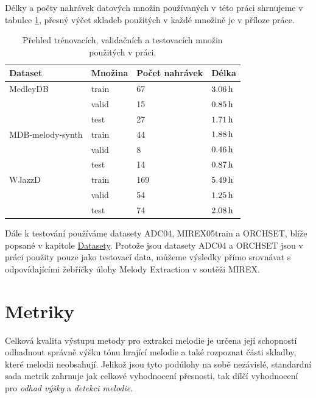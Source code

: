 Délky a počty nahrávek datových množin používaných v této práci shrnujeme v tabulce \ref{tab:data_splits}, přesný výčet skladeb použitých v každé množině je v příloze práce.

\begin{table}[h!]
\centering
\begin{tabular}{llll}
\toprule
Dataset          & Množina & Počet nahrávek & Délka \\
\midrule
MedleyDB         & train   & 67             & $3.06\,\rm h$ \\
                 & valid   & 15             & $0.85\,\rm h$ \\
                 & test    & 27             & $1.71\,\rm h$ \\
MDB-melody-synth & train   & 44             & $1.88\,\rm h$ \\
                 & valid   & 8              & $0.46\,\rm h$ \\
                 & test    & 14             & $0.87\,\rm h$ \\
WJazzD           & train   & 169            & $5.49\,\rm h$ \\
                 & valid   & 54             & $1.25\,\rm h$ \\
                 & test    & 74             & $2.08\,\rm h$ \\
\bottomrule
\end{tabular}
\caption{Přehled trénovacích, validačních a testovacích množin použitých v práci.}\label{tab:data_splits}
\end{table}

Dále k testování používáme datasety ADC04, MIREX05train a ORCHSET, blíže popsané v kapitole \hyperref[chap:datasety]{Datasety}. Protože jsou datasety ADC04 a ORCHSET jsou v práci použity pouze jako testovací data, můžeme výsledky přímo srovnávat s odpovídajícími žebříčky úlohy Melody Extraction v soutěži MIREX.




\section{Metriky}

Celková kvalita výstupu metody pro extrakci melodie je určena její schopností odhadnout správně výšku tónu hrající melodie a také rozpoznat části skladby, které melodii neobsahují. Jelikož jsou tyto podúlohy na sobě nezávislé, standardní sada metrik zahrnuje jak celkové vyhodnocení přesnosti, tak dílčí vyhodnocení pro \textit{odhad výšky} a \textit{detekci melodie}. 

